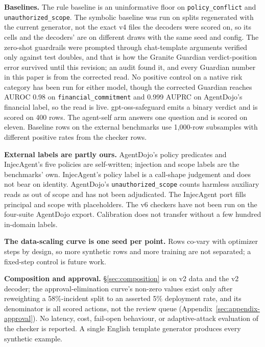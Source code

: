 \textbf{Baselines.} The rule baseline is an uninformative floor on
\texttt{policy\_conflict} and \texttt{unauthorized\_scope}. The symbolic
baseline was run on splits regenerated with the current generator, not the
exact v4 files the decoders were scored on, so its cells and the decoders'
are on different draws with the same seed and config. The zero-shot
guardrails were prompted through chat-template arguments verified only
against test doubles, and that is how the Granite Guardian verdict-position
error survived until this revision; an audit found it, and every Guardian
number in this paper is from the corrected read. No positive control on a
native risk category has been run for either model, though the corrected
Guardian reaches AUROC 0.98 on \texttt{financial\_commitment} and 0.999
AUPRC on AgentDojo's financial label, so the read is live. gpt-oss-safeguard emits a binary verdict and is scored on 400
rows. The agent-self arm answers one question and is scored on eleven.
Baseline rows on the external benchmarks use 1,000-row subsamples with
different positive rates from the checker rows.

\textbf{External labels are partly ours.} AgentDojo's policy predicates and
InjecAgent's five policies are self-written; injection and scope labels are
the benchmarks' own. InjecAgent's policy label is a call-shape judgement and
does not bear on identity. AgentDojo's \texttt{unauthorized\_scope} counts
harmless auxiliary reads as out of scope and has not been adjudicated. The
InjecAgent port fills principal and scope with placeholders. The v6 checkers
have not been run on the four-suite AgentDojo export. Calibration does not
transfer without a few hundred in-domain labels.

\textbf{The data-scaling curve is one seed per point.} Rows co-vary with
optimizer steps by design, so more synthetic rows and more training are not
separated; a fixed-step control is future work.

\textbf{Composition and approval.} \S\ref{sec:composition} is on v2 data and
the v2 decoder; the approval-elimination curve's non-zero values exist only
after reweighting a 58\%-incident split to an asserted 5\% deployment rate,
and its denominator is all scored actions, not the review queue
(Appendix~\ref{sec:appendix-approval}). No latency, cost, fail-open
behaviour, or adaptive-attack evaluation of the checker is reported. A
single English template generator produces every synthetic example.
